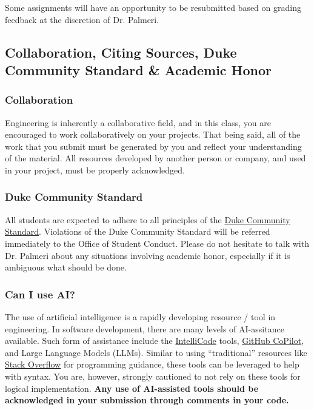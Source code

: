 \documentclass[10pt]{report}
\begin{document}
Some assignments will have an opportunity to be resubmitted based on grading
feedback at the discretion of Dr. Palmeri.

\subsection*{Collaboration, Citing Sources, Duke Community Standard \& Academic Honor}
\subsubsection*{Collaboration} Engineering is inherently a collaborative field,
and in this class, you are encouraged to work collaboratively on your projects.
That being said, all of the work that you submit must be generated by you and
reflect your understanding of the material. All resources developed by another
person or company, and used in your project, must be properly acknowledged.

\subsubsection{Duke Community Standard}
All students are expected to adhere to all principles of the
\href{https://trinity.duke.edu/undergraduate/academic-policies/community-standard-student-conduct}{Duke
Community Standard}. Violations of the Duke Community Standard will be referred
immediately to the Office of Student Conduct. Please do not hesitate to talk
with Dr. Palmeri about any situations involving academic honor, especially if it
is ambiguous what should be done.

\subsubsection*{Can I use AI?}
The use of artificial intelligence is a rapidly developing resource / tool in
engineering.  In software development, there are many levels of AI-assitance
available.  Such form of assistance include the
\href{https://visualstudio.microsoft.com/services/intellicode/}{IntelliCode}
tools, \href{https://github.com/features/copilot}{GitHub CoPilot}, and Large
Language Models (LLMs).  Similar to using ``traditional'' resources like
\href{https://stackoverflow.com/}{Stack Overflow} for programming guidance,
these tools can be leveraged to help with syntax.  You are, however, strongly
cautioned to not rely on these tools for logical implementation.  \textbf{Any
use of AI-assisted tools should be acknowledged in your submission through
comments in your code.}
\end{document}

